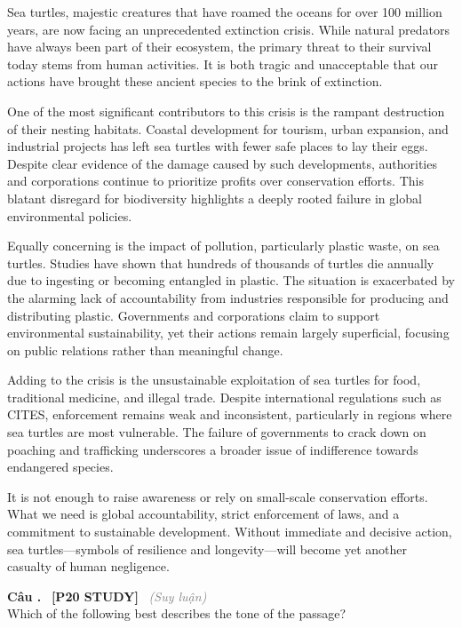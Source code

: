 \documentclass[12pt,a4paper,twoside]{article}
\newcounter{qcounter}
\newcommand{\question}[2][]{%
    \stepcounter{qcounter}%
    \par\vspace{6pt}%
    \noindent\textcolor{primaryBlue}{\textbf{Câu \theqcounter.}}~%
    \textcolor{secondaryBlue}{\small\textbf{[P20 STUDY]}}~%
    \if\relax\detokenize{#1}\relax\else\textcolor{gray}{\small\textit{(#1)}}~\fi\\[1pt]
    \noindent #2%
}
\newenvironment{readingpassage}[1][]{%
    \begin{tcolorbox}[enhanced, colback=grayLight, colframe=secondaryBlue,
        coltitle=textDark, fonttitle=\bfseries, title={#1},
        rounded corners, arc=3mm, boxrule=1pt,
        left=15pt, right=15pt, top=10pt, bottom=10pt,
        breakable, before skip=10pt, after skip=10pt, drop fuzzy shadow]
    \setstretch{1.3}
}{\end{tcolorbox}}
\begin{document}
\begin{readingpassage}[]
Sea turtles, majestic creatures that have roamed the oceans for over 100 million years, are now facing an unprecedented extinction crisis. While natural predators have always been part of their ecosystem, the primary threat to their survival today stems from human activities. It is both tragic and unacceptable that our actions have brought these ancient species to the brink of extinction.

One of the most significant contributors to this crisis is the rampant destruction of their nesting habitats. Coastal development for tourism, urban expansion, and industrial projects has left sea turtles with fewer safe places to lay their eggs. Despite clear evidence of the damage caused by such developments, authorities and corporations continue to prioritize profits over conservation efforts. This blatant disregard for biodiversity highlights a deeply rooted failure in global environmental policies.

Equally concerning is the impact of pollution, particularly plastic waste, on sea turtles. Studies have shown that hundreds of thousands of turtles die annually due to ingesting or becoming entangled in plastic. The situation is exacerbated by the alarming lack of accountability from industries responsible for producing and distributing plastic. Governments and corporations claim to support environmental sustainability, yet their actions remain largely superficial, focusing on public relations rather than meaningful change.

Adding to the crisis is the unsustainable exploitation of sea turtles for food, traditional medicine, and illegal trade. Despite international regulations such as CITES, enforcement remains weak and inconsistent, particularly in regions where sea turtles are most vulnerable. The failure of governments to crack down on poaching and trafficking underscores a broader issue of indifference towards endangered species.

It is not enough to raise awareness or rely on small-scale conservation efforts. What we need is global accountability, strict enforcement of laws, and a commitment to sustainable development. Without immediate and decisive action, sea turtles—symbols of resilience and longevity—will become yet another casualty of human negligence.
\end{readingpassage}

\question[Suy luận]{Which of the following best describes the tone of the passage?}
\end{document}
